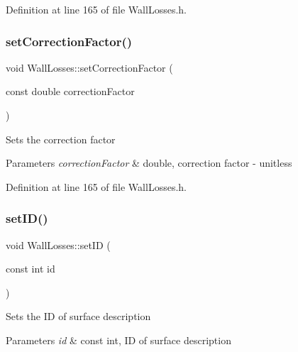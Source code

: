Definition at line 165 of file Wall\+Losses.\+h.

\mbox{\label{class_wall_losses_affdf3f6c3d54d73c7f91e1515fb12533}} 
\subsubsection{\texorpdfstring{set\+Correction\+Factor()}{setCorrectionFactor()}\hspace{0.1cm}{\footnotesize\ttfamily [3/3]}}
{\footnotesize\ttfamily void Wall\+Losses\+::set\+Correction\+Factor (\begin{DoxyParamCaption}\item[{const double}]{correction\+Factor }\end{DoxyParamCaption})\hspace{0.3cm}{\ttfamily [inline]}}

Sets the correction factor 
\begin{DoxyParams}{Parameters}
{\em correction\+Factor} & double, correction factor -\/ unitless \\
\hline
\end{DoxyParams}


Definition at line 165 of file Wall\+Losses.\+h.

\mbox{\label{class_wall_losses_a3a135d9bfd6c6f1c4742031ab568b26d}} 
\subsubsection{\texorpdfstring{set\+I\+D()}{setID()}\hspace{0.1cm}{\footnotesize\ttfamily [1/3]}}
{\footnotesize\ttfamily void Wall\+Losses\+::set\+ID (\begin{DoxyParamCaption}\item[{const int}]{id }\end{DoxyParamCaption})\hspace{0.3cm}{\ttfamily [inline]}}

Sets the ID of surface description 
\begin{DoxyParams}{Parameters}
{\em id} & const int, ID of surface description \\
\hline
\end{DoxyParams}


